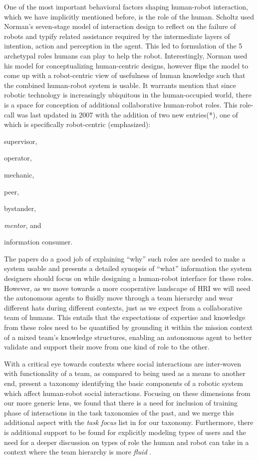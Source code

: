 \documentclass[letterpaper, 10 pt, conference]{ieeeconf}  %
\theoremstyle{definition}
\begin{document}
One of the most important behavioral factors shaping human-robot interaction, which we have implicitly mentioned before, is the role of the human.
Scholtz \cite{Scholtz2003} used Norman's seven-stage model of interaction design \cite{Norman1986} to reflect on the failure of robots and typify related assistance required by the intermediate layers of intention, action and perception in the agent.
This led to formulation of the 5 archetypal roles humans can play to help the robot.
Interestingly, Norman used his model for conceptualizing human-centric designs, however \cite{Scholtz2003} flips the model to come up with a robot-centric view of usefulness of human knowledge such that the combined human-robot system is usable.
It warrants mention that since robotic technology is increasingly ubiquitous in the human-occupied world, there is a space for conception of additional collaborative human-robot roles.
This role-call was last updated in 2007 \cite{Goodrich2007} with the addition of two new entries(*), one of which is specifically robot-centric (emphasized): \begin{enumerate*}
    \item supervisor,
    \item operator,
    \item mechanic,
    \item peer,
    \item bystander,
    \item *\textit{mentor}, and
    \item *information consumer.
\end{enumerate*}
The papers do a good job of explaining ``why'' such roles are needed to make a system usable and presents a detailed synopsis of ``what'' information the system designers should focus on while designing a human-robot interface for these roles.
However, as we move towards a more cooperative landscape of HRI we will need the autonomous agents to fluidly move through a team hierarchy and wear different hats during different contexts, just as we expect from a collaborative team of humans.
This entails that the expectations of expertise and knowledge from these roles need to be quantified by grounding it within the mission context of a mixed team's knowledge structures, enabling an autonomous agent to better validate and support their move from one kind of role to the other.

With a critical eye towards contexts where social interactions are inter-woven with functionality of a team, as compared to being used as a means to another end, \cite{Fong2003, Feil-Seifer, Dautenhahn2007} present a taxonomy identifying the basic components of a robotic system which affect human-robot social interactions.
Focusing on these dimensions from our more generic lens, we found that there is a need for inclusion of training phase of interactions \cite{Fong2003} in the task taxonomies of the past, and we merge this additional aspect with the \textit{task focus} list in \cite{Beer2017} for our taxonomy.
Furthermore, there is additional support to be found for explicitly modeling types of users and the need for a deeper discussion on types of role the human and robot can take in a context where the team hierarchy is more \textit{fluid} \cite{Feil-Seifer, Dautenhahn2007}.
\end{document}
